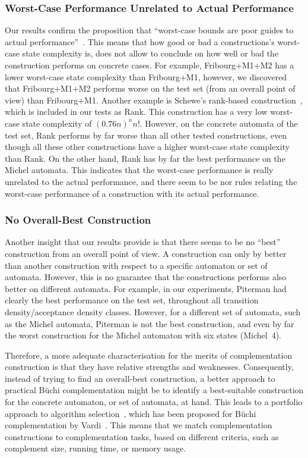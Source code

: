 \subsubsection{Worst-Case Performance Unrelated to Actual Performance}
Our results confirm the proposition that ``worst-case bounds are poor guides to actual performance''~\cite{2011_tsai}. This means that how good or bad a constructions's worst-case state complexity is, does not allow to conclude on how well or bad the construction performs on concrete cases. For example, Fribourg+M1+M2 has a lower worst-case state complexity than Fribourg+M1, however, we discovered that Fribourg+M1+M2 performs worse on the \goal{} test set (from an overall point of view) than Fribourg+M1. Another example is Schewe's rank-based construction~\cite{schewe2009buchi}, which is included in our tests as Rank. This construction has a very low worst-case state complexity of $(0.76n)^nn!$. However, on the concrete automata of the \goal{} test set, Rank performs by far worse than all other tested constructions, even though all these other constructions have a higher worst-case state complexity than Rank. On the other hand, Rank has by far the best performance on the Michel automata. This indicates that the worst-case performance is really unrelated to the actual performance, and there seem to be nor rules relating the worst-case performance of a construction with its actual performance.

\subsubsection{No Overall-Best Construction}
Another insight that our results provide is that there seems to be no ``best'' construction from an overall point of view. A construction can only by better than another construction with respect to a specific automaton or set of automata. However, this is no guarantee that the constructions performs also better on different automata. For example, in our experiments, Piterman had clearly the best performance on the \goal{} test set, throughout all transition density/acceptance density classes. However, for a different set of automata, such as the Michel automata, Piterman is not the best construction, and even by far the worst construction for the Michel automaton with six states (Michel~4).

Therefore, a more adequate characterisation for the merits of complementation construction is that they have relative strengths and weaknesses. Consequently, instead of trying to find an overall-best construction, a better approach to practical Büchi complementation might be to identify a best-suitable construction for the concrete automaton, or set of automata, at hand. This leads to a portfolio approach to algorithm selection~\cite{leyton2003portfolio}, which has been proposed for Büchi complementation by Vardi~\cite{2007_vardi_model_checking}. This means that we match complementation constructions to complementation tasks, based on different criteria, such as complement size, running time, or memory usage.

